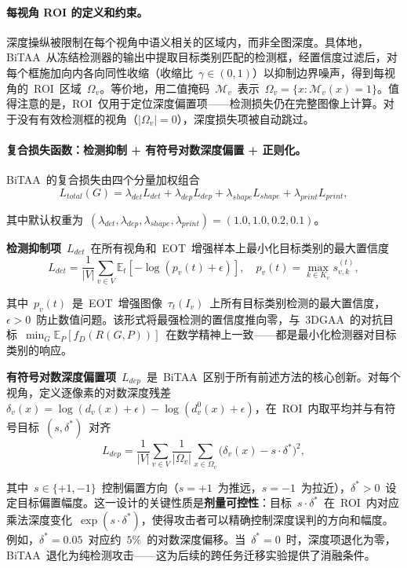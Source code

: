 \paragraph{每视角 ROI 的定义和约束。}
深度操纵被限制在每个视角中语义相关的区域内，而非全图深度。具体地，BiTAA~从冻结检测器的输出中提取目标类别匹配的检测框，经置信度过滤后，对每个框施加向内各向同性收缩（收缩比~$\gamma \in (0,1)$）以抑制边界噪声，得到每视角的~ROI~区域~$\Omega_v$。等价地，用二值掩码~$\mathcal{M}_v$~表示~$\Omega_v = \{x : \mathcal{M}_v(x) = 1\}$。值得注意的是，ROI~仅用于定位深度偏置项——检测损失仍在完整图像上计算。对于没有有效检测框的视角（$|\Omega_v| = 0$），深度损失项被自动跳过。

\paragraph{复合损失函数：检测抑制 + 有符号对数深度偏置 + 正则化。}
BiTAA~的复合损失由四个分量加权组合
\begin{equation}
    L_{total}(G) = \lambda_{det} L_{det} + \lambda_{dep} L_{dep} + \lambda_{shape} L_{shape} + \lambda_{print} L_{print},
\end{equation}

其中默认权重为~$(\lambda_{det}, \lambda_{dep}, \lambda_{shape}, \lambda_{print}) = (1.0, 1.0, 0.2, 0.1)$。

\textbf{检测抑制项}~$L_{det}$~在所有视角和~EOT~增强样本上最小化目标类别的最大置信度
\begin{equation}
    L_{det} = \frac{1}{|V|} \sum_{v \in V} \mathbb{E}_t \left[ -\log(p_v(t) + \epsilon) \right], \quad p_v(t) = \max_{k \in K_v} s_{v,k}^{(t)},
\end{equation}

其中~$p_v(t)$~是~EOT~增强图像~$\tau_t(I_v)$~上所有目标类别检测的最大置信度，$\epsilon > 0$~防止数值问题。该形式将最强检测的置信度推向零，与~3DGAA~的对抗目标~$\min_G \mathbb{E}_{P}[f_D(R(G,P))]$~在数学精神上一致——都是最小化检测器对目标类别的响应。

\textbf{有符号对数深度偏置项}~$L_{dep}$~是~BiTAA~区别于所有前述方法的核心创新。对每个视角，定义逐像素的对数深度残差~$\delta_v(x) = \log(d_v(x) + \epsilon) - \log(d_v^0(x) + \epsilon)$，在~ROI~内取平均并与有符号目标~$(s, \delta^*)$~对齐
\begin{equation}
    L_{dep} = \frac{1}{|V|} \sum_{v \in V} \frac{1}{|\Omega_v|} \sum_{x \in \Omega_v} \bigl(\delta_v(x) - s \cdot \delta^*\bigr)^2,
\end{equation}

其中~$s \in \{+1, -1\}$~控制偏置方向（$s = +1$~为推远，$s = -1$~为拉近），$\delta^* > 0$~设定目标偏置幅度。这一设计的关键性质是\textbf{剂量可控性}：目标~$s \cdot \delta^*$~在~ROI~内对应乘法深度变化~$\exp(s \cdot \delta^*)$，使得攻击者可以精确控制深度误判的方向和幅度。例如，$\delta^* = 0.05$~对应约~$5\%$~的对数深度偏移。当~$\delta^* = 0$~时，深度项退化为零，BiTAA~退化为纯检测攻击——这为后续的跨任务迁移实验提供了消融条件。

